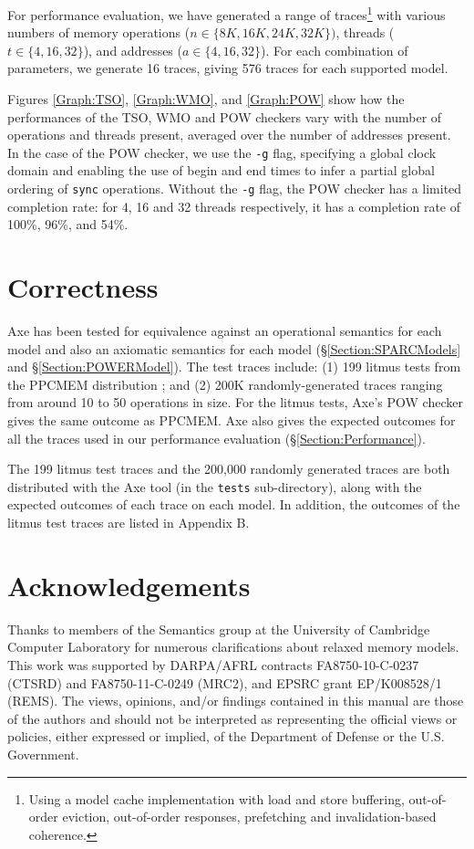 \documentclass[11pt]{article}
\begin{document}
For performance evaluation, we have generated a range of
traces\footnote{Using a model cache implementation 
with load and store buffering, out-of-order eviction,
out-of-order responses, prefetching and invalidation-based coherence.}
with various numbers of memory operations ($n \in \{8K, 16K, 24K,
32K\})$, threads ($t \in \{4, 16, 32\}$), and addresses ($a \in \{4,
16, 32\}$).  For each combination of parameters, we generate 16
traces, giving 576 traces for each supported model.

Figures \ref{Graph:TSO}, \ref{Graph:WMO}, and \ref{Graph:POW} show how
the performances of the TSO, WMO and POW checkers vary with the number
of operations and threads present, averaged over the number of
addresses present.  In the case of the POW checker, we use the
\verb!-g! flag, specifying a global clock domain and 
enabling the use of begin and end times to infer a partial global
ordering of \verb!sync! operations.  Without the \verb!-g! flag, the
POW checker has a limited completion rate: for 4, 16 and 32 threads
respectively, it has a completion rate of 100\%, 96\%, and 54\%.

\section{Correctness}
\label{Section:Correctness}

Axe has been tested for equivalence against an operational semantics
for each model and also an axiomatic semantics for each model
(\S\ref{Section:SPARCModels} and \S\ref{Section:POWERModel}).  The
test traces include: (1) 199 litmus tests from the PPCMEM distribution
\cite{PPCMEM}; and (2) 200K randomly-generated traces ranging from
around 10 to 50 operations in size.  For the litmus tests, Axe's POW
checker gives the same outcome as PPCMEM.  Axe also gives the expected
outcomes for all the traces used in our performance evaluation
(\S\ref{Section:Performance}).  

The 199 litmus test traces and the 200,000 randomly generated traces are
both distributed with the Axe tool (in the \verb!tests!
sub-directory), along with the expected outcomes of each trace on each
model.  In addition, the outcomes of the litmus test traces are listed
in Appendix B.

\section*{Acknowledgements}

Thanks to members of the Semantics group at the University of
Cambridge Computer Laboratory for numerous clarifications about
relaxed memory models.  This work was supported by DARPA/AFRL
contracts FA8750-10-C-0237 (CTSRD) and FA8750-11-C-0249 (MRC2), and
EPSRC grant EP/K008528/1 (REMS).  The views, opinions, and/or findings
contained in this manual are those of the authors and should not be
interpreted as representing the official views or policies, either
expressed or implied, of the Department of Defense or the U.S.
Government.
\end{document}

